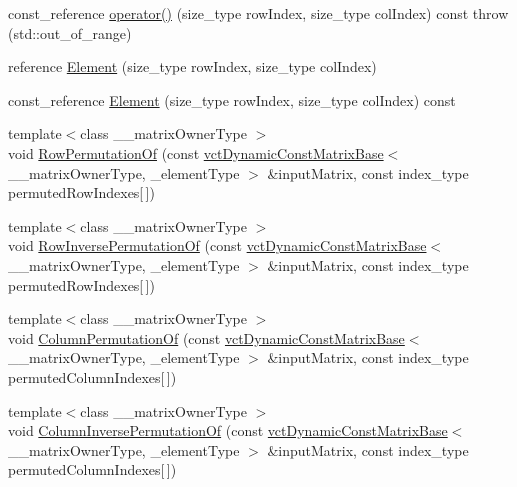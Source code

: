 \begin{DoxyCompactItemize}
\item 
const\+\_\+reference \hyperlink{classvct_dynamic_matrix_base_ab58164aef4b2d4e45340816f9ece2261}{operator()} (size\+\_\+type row\+Index, size\+\_\+type col\+Index) const   throw (std\+::out\+\_\+of\+\_\+range)
\item 
reference \hyperlink{classvct_dynamic_matrix_base_a996e62823119b25a18255e05ade49446}{Element} (size\+\_\+type row\+Index, size\+\_\+type col\+Index)
\item 
const\+\_\+reference \hyperlink{classvct_dynamic_matrix_base_a33ed80b9a281c2939dd9069b4b4d2d9b}{Element} (size\+\_\+type row\+Index, size\+\_\+type col\+Index) const 
\item 
{\footnotesize template$<$class \+\_\+\+\_\+matrix\+Owner\+Type $>$ }\\void \hyperlink{classvct_dynamic_matrix_base_ab472d1eefb5f1a9f44470a06f5dff6fc}{Row\+Permutation\+Of} (const \hyperlink{classvct_dynamic_const_matrix_base}{vct\+Dynamic\+Const\+Matrix\+Base}$<$ \+\_\+\+\_\+matrix\+Owner\+Type, \+\_\+element\+Type $>$ \&input\+Matrix, const index\+\_\+type permuted\+Row\+Indexes\mbox{[}$\,$\mbox{]})
\item 
{\footnotesize template$<$class \+\_\+\+\_\+matrix\+Owner\+Type $>$ }\\void \hyperlink{classvct_dynamic_matrix_base_a3669cd2217012657d5d3eed0c454216c}{Row\+Inverse\+Permutation\+Of} (const \hyperlink{classvct_dynamic_const_matrix_base}{vct\+Dynamic\+Const\+Matrix\+Base}$<$ \+\_\+\+\_\+matrix\+Owner\+Type, \+\_\+element\+Type $>$ \&input\+Matrix, const index\+\_\+type permuted\+Row\+Indexes\mbox{[}$\,$\mbox{]})
\item 
{\footnotesize template$<$class \+\_\+\+\_\+matrix\+Owner\+Type $>$ }\\void \hyperlink{classvct_dynamic_matrix_base_abc8ce418ac2652c25ff8ac707d536ba1}{Column\+Permutation\+Of} (const \hyperlink{classvct_dynamic_const_matrix_base}{vct\+Dynamic\+Const\+Matrix\+Base}$<$ \+\_\+\+\_\+matrix\+Owner\+Type, \+\_\+element\+Type $>$ \&input\+Matrix, const index\+\_\+type permuted\+Column\+Indexes\mbox{[}$\,$\mbox{]})
\item 
{\footnotesize template$<$class \+\_\+\+\_\+matrix\+Owner\+Type $>$ }\\void \hyperlink{classvct_dynamic_matrix_base_ac46e977f79289e6253bdc4bf0c7f24d6}{Column\+Inverse\+Permutation\+Of} (const \hyperlink{classvct_dynamic_const_matrix_base}{vct\+Dynamic\+Const\+Matrix\+Base}$<$ \+\_\+\+\_\+matrix\+Owner\+Type, \+\_\+element\+Type $>$ \&input\+Matrix, const index\+\_\+type permuted\+Column\+Indexes\mbox{[}$\,$\mbox{]})

\end{DoxyCompactItemize}

